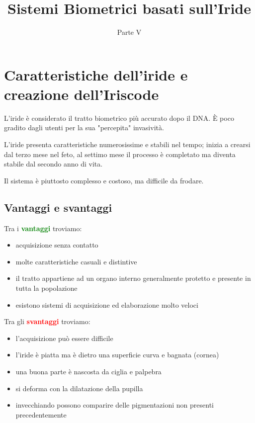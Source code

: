 \documentclass{report}
\title{Sistemi Biometrici basati sull'Iride}
\date{Parte V}
\begin{document}
\maketitle

\tableofcontents
\newpage


\chapter{Caratteristiche dell'iride e creazione dell'Iriscode}

L'iride è considerato il tratto biometrico più accurato
dopo il DNA. È poco gradito dagli utenti per la sua
"percepita" invasività.

\noindent L'iride presenta caratteristiche numerosissime e stabili 
nel tempo; inizia a crearsi dal terzo mese nel feto, al settimo mese 
il processo è completato ma diventa stabile dal secondo anno di vita.

\noindent Il sistema è piuttosto complesso e costoso, ma difficile da frodare.

\section{Vantaggi e svantaggi}

Tra i \textbf{\textcolor{green}{vantaggi}} troviamo:
\begin{itemize}
    \item acquisizione senza contatto
    \item molte caratteristiche casuali e distintive
    \item il tratto appartiene ad un organo interno generalmente protetto e presente in tutta la popolazione
    \item esistono sistemi di acquisizione ed elaborazione molto veloci
\end{itemize}
Tra gli \textbf{\textcolor{red}{svantaggi}} troviamo:
\begin{itemize}
    \item l'acquisizione può essere difficile 
    \item l'iride è piatta ma è dietro una superficie curva e bagnata (cornea)
    \item una buona parte è nascosta da ciglia e palpebra
    \item si deforma con la dilatazione della pupilla
    \item invecchiando possono comparire delle pigmentazioni non presenti
    precedentemente
\end{itemize}
\end{document}
